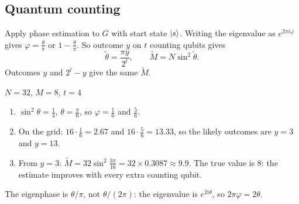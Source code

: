 \documentclass[11pt,a4paper,openany]{book}
\newcounter{wex}[section]
\newenvironment{steps}{\begin{enumerate}[label=\textbf{Step \arabic*.}, leftmargin=4.2em, itemsep=2pt]}{\end{enumerate}}
\begin{document}
\subsection{Quantum counting}
Apply phase estimation to $G$ with start state $\ket{s}$. Writing the eigenvalue as $e^{2\pi i\varphi}$ gives $\varphi = \frac\theta\pi$ or $1 - \frac\theta\pi$. So outcome $y$ on $t$ counting qubits gives
\[ \tilde\theta = \frac{\pi y}{2^t}, \qquad \tilde M = N\sin^2\tilde\theta. \]
Outcomes $y$ and $2^t - y$ give the same $\tilde M$.
\begin{wexample}{$N = 32$, $M = 8$, $t = 4$}
\begin{steps}
\item $\sin^2\theta = \frac14$, $\theta = \frac\pi6$, so $\varphi = \frac16$ and $\frac56$.
\item On the grid: $16\cdot\frac16 = 2.67$ and $16\cdot\frac56 = 13.33$, so the likely outcomes are $y = 3$ and $y = 13$.
\item From $y = 3$: $\tilde M = 32\sin^2\frac{3\pi}{16} = 32\times0.3087 \approx 9.9$. The true value is $8$: the estimate improves with every extra counting qubit.
\end{steps}
\end{wexample}
\begin{trap}
The eigenphase is $\theta/\pi$, not $\theta/(2\pi)$: the eigenvalue is $e^{2i\theta}$, so $2\pi\varphi = 2\theta$.
\end{trap}

\end{document}
